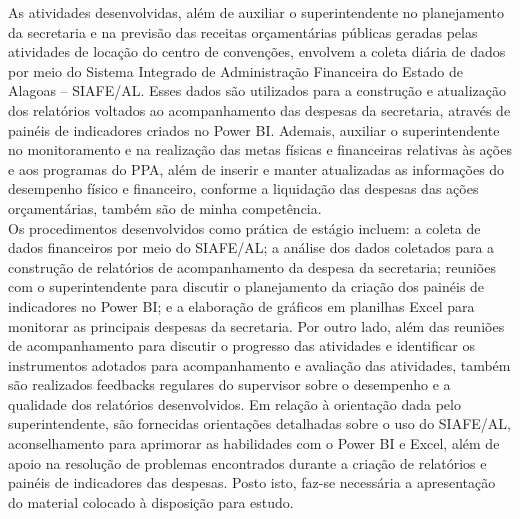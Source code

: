 \documentclass[12pt,a4paper]{article}
\begin{document}
\hspace*{1,5cm}As atividades desenvolvidas, além de auxiliar o superintendente no planejamento da 
secretaria e na previsão das receitas orçamentárias públicas geradas pelas atividades de locação 
do centro de convenções, envolvem a coleta diária de dados por meio do Sistema Integrado de 
Administração Financeira do Estado de Alagoas – SIAFE/AL. Esses dados são utilizados para 
a construção e atualização dos relatórios voltados ao acompanhamento das despesas da 
secretaria, através de painéis de indicadores criados no Power BI. Ademais, auxiliar o 
superintendente no monitoramento e na realização das metas físicas e financeiras relativas às 
ações e aos programas do PPA, além de inserir e manter atualizadas as informações do 
desempenho físico e financeiro, conforme a liquidação das despesas das ações orçamentárias, 
também são de minha competência. \\
\hspace*{1,5cm}Os procedimentos desenvolvidos como prática de estágio incluem: a coleta de dados 
financeiros por meio do SIAFE/AL; a análise dos dados coletados para a construção de 
relatórios de acompanhamento da despesa da secretaria; reuniões com o superintendente para 
discutir o planejamento da criação dos painéis de indicadores no Power BI; e a elaboração de 
gráficos em planilhas Excel para monitorar as principais despesas da secretaria. Por outro lado, 
além das reuniões de acompanhamento para discutir o progresso das atividades e identificar os 
instrumentos adotados para acompanhamento e avaliação das atividades, também são 
realizados feedbacks regulares do supervisor sobre o desempenho e a qualidade dos relatórios 
desenvolvidos. Em relação à orientação dada pelo superintendente, são fornecidas orientações 
detalhadas sobre o uso do SIAFE/AL, aconselhamento para aprimorar as habilidades com o 
Power BI e Excel, além de apoio na resolução de problemas encontrados durante a criação de 
relatórios e painéis de indicadores das despesas. Posto isto, faz-se necessária a apresentação do 
material colocado à disposição para estudo.
\end{document}
